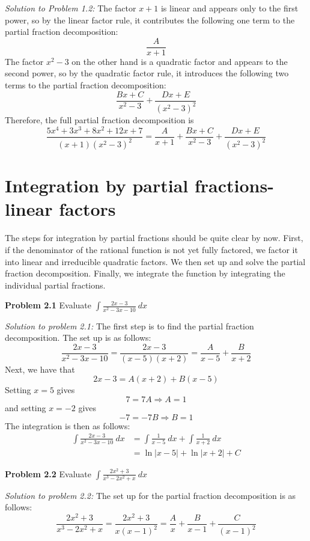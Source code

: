 \documentclass[11pt]{scrartcl}
\begin{document}
\noindent 
\textit{Solution to Problem 1.2:} The factor $x+1$ is linear and appears only to the first power, so by the linear factor rule, it contributes the following one term to the partial fraction decomposition: 
$$\frac{A}{x+1}$$
\noindent 
The factor $x^2-3$ on the other hand is a quadratic factor and appears to the second power, so by the quadratic factor rule, it introduces the following two terms to the partial fraction decomposition: 
$$\frac{Bx+C}{x^2-3}+\frac{Dx+E}{(x^2-3)^2}$$
\noindent 
Therefore, the full partial fraction decomposition is 
$$\frac{5x^4+3x^3+8x^2+12x+7}{(x+1)(x^2-3)^2}=\frac{A}{x+1}+\frac{Bx+C}{x^2-3}+\frac{Dx+E}{(x^2-3)^2}$$
\section{Integration by partial fractions-linear factors}
\noindent 
The steps for integration by partial fractions should be quite clear by now. First, if the denominator of the rational function is not yet fully factored, we factor it into linear and irreducible quadratic factors. We then set up and solve the partial fraction decomposition. Finally, we integrate the function by integrating the individual partial fractions. 
\begin{tcolorbox}
[colback=purple!5!white,colframe=purple!75!black]
\textbf{Problem 2.1} Evaluate $\int{\frac{2x-3}{x^2-3x-10} \ dx}$
\end{tcolorbox}
\noindent 
\textit{Solution to problem 2.1:} The first step is to find the partial fraction decomposition. The set up is as follows: 
$$\frac{2x-3}{x^2-3x-10}=\frac{2x-3}{(x-5)(x+2)}=\frac{A}{x-5}+\frac{B}{x+2}$$
Next, we have that 
$$2x-3=A(x+2)+B(x-5)$$
Setting $x=5$ gives 
$$7=7A \Rightarrow A=1$$
and setting $x=-2$ gives 
$$-7=-7B \Rightarrow B=1$$
The integration is then as follows: 
\begin{align*}
    \int{\frac{2x-3}{x^2-3x-10} \ dx} &=\int{\frac{1}{x-5} \ dx}+\int{\frac{1}{x+2} \ dx} \\
                                      &=\ln \lvert x-5 \rvert+ \ln \lvert x+2 \rvert +C
\end{align*}
\begin{tcolorbox}
[colback=purple!5!white,colframe=purple!75!black]
\textbf{Problem 2.2} Evaluate $\int{\frac{2x^2+3}{x^3-2x^2+x} \ dx}$
\end{tcolorbox}
\noindent 
\textit{Solution to problem 2.2:} The set up for the partial fraction decomposition is as follows: 
$$\frac{2x^2+3}{x^3-2x^2+x}=\frac{2x^2+3}{x(x-1)^2}=\frac{A}{x}+\frac{B}{x-1}+\frac{C}{(x-1)^2}$$
\end{document}

